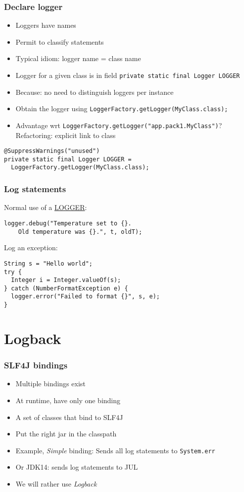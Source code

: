 \documentclass[french, english]{beamer}
\begin{document}
\begin{frame}[fragile]
	\frametitle{Declare logger}
	\begin{itemize}
		\item Loggers have names
		\item Permit to classify statements
		\item Typical idiom: logger name = class name
		\item Logger for a given class is in field \texttt{private static final Logger LOGGER}
		\item Because: no need to distinguish loggers per instance
		\item Obtain the logger using \texttt{LoggerFactory.getLogger(MyClass.class);}
		\item Advantage wrt \texttt{LoggerFactory.getLogger("app.pack1.MyClass")}? \pause Refactoring: explicit link to class \pause
	\end{itemize}
	\begin{lstlisting}
@SuppressWarnings("unused")
private static final Logger LOGGER = 
  LoggerFactory.getLogger(MyClass.class);
	\end{lstlisting}
\end{frame}

\begin{frame}[fragile]
	\frametitle{Log statements}
	Normal use of a \href{https://www.slf4j.org/api/org/slf4j/Logger.html}{LOGGER}:
	\begin{lstlisting}
logger.debug("Temperature set to {}. 
    Old temperature was {}.", t, oldT);
	\end{lstlisting}
	\vspace{1em}
	Log an exception:
	\begin{lstlisting}
String s = "Hello world";
try {
  Integer i = Integer.valueOf(s);
} catch (NumberFormatException e) {
  logger.error("Failed to format {}", s, e);
}
	\end{lstlisting}
\end{frame}

\section{Logback}
\begin{frame}
	\frametitle{SLF4J bindings}
	\begin{itemize}
		\item Multiple bindings exist
		\item At runtime, have only one binding
		\item A set of classes that bind to SLF4J
		\item Put the right jar in the classpath
		\item Example, \emph{Simple} binding: Sends all log statements to \texttt{System.err}
		\item Or JDK14: sends log statements to JUL
		\item We will rather use \emph{Logback}
	\end{itemize}
\end{frame}
\end{document}
